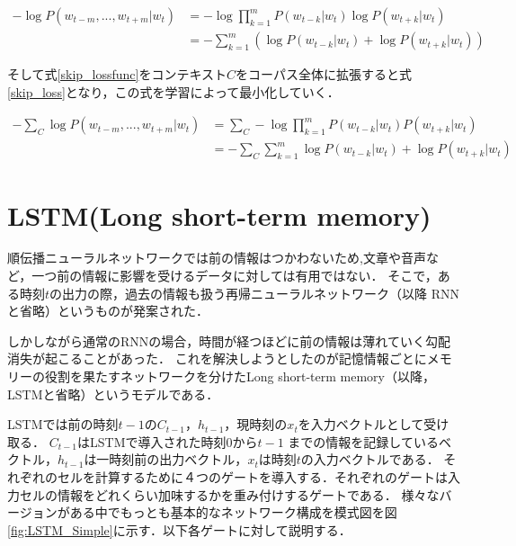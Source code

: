 \documentclass[a4j,11pt,report]{jsbook}
\begin{document}
\begin{equation}
  \label{skip_lossfunc}
  \begin{split}
    -\log P(w_{t-m},...,w_{t+m}|w_{t} ) &= -\log \prod_{k = 1}^m P(w_{t-k}|w_{t}) \log P(w_{t+k}|w_{t})  \\
    &= - \sum_{k = 1}^m  ( \log P(w_{t-k} | w_{t}) + \log P(w_{t+k}|w_{t}) )
  \end{split}
\end{equation}

そして式\ref{skip_lossfunc}をコンテキスト$C$をコーパス全体に拡張すると式\ref{skip_loss}となり，この式を学習によって最小化していく．

\begin{equation}
  \label{skip_loss}
  \begin{split}
    - \sum_{C} \log P(w_{t-m},...,w_{t+m}|w_{t} ) &= \sum_{C} -\log \prod_{k = 1}^m P(w_{t-k}|w_{t}) P(w_{t+k}|w_{t})   \\
    &= - \sum_{C} \sum_{k = 1}^m \log P(w_{t-k} | w_{t}) + \log P(w_{t+k} | w_{t})
  \end{split}
\end{equation}


\chapter{LSTM(Long short-term memory)\label{ch:LSTM}}
順伝播ニューラルネットワークでは前の情報はつかわないため,文章や音声など，一つ前の情報に影響を受けるデータに対しては有用ではない．
そこで，ある時刻$t$の出力の際，過去の情報も扱う再帰ニューラルネットワーク（以降 RNN と省略）というものが発案された．

しかしながら通常のRNNの場合，時間が経つほどに前の情報は薄れていく勾配消失が起こることがあった．
これを解決しようとしたのが記憶情報ごとにメモリーの役割を果たすネットワークを分けたLong short-term memory（以降，LSTMと省略）というモデルである．

LSTMでは前の時刻$t-1$の$C_{t-1}$，$h_{t-1}$，現時刻の$x_{t}$を入力ベクトルとして受け取る．
$C_{t-1}$はLSTMで導入された時刻0から$t-1$ までの情報を記録しているベクトル，$h_{t-1}$は一時刻前の出力ベクトル，$x_{t}$は時刻$t$の入力ベクトルである．
それぞれのセルを計算するために４つのゲートを導入する．それぞれのゲートは入力セルの情報をどれくらい加味するかを重み付けするゲートである．
様々なバージョンがある中でもっとも基本的なネットワーク構成を模式図を図\ref{fig:LSTM_Simple}に示す．以下各ゲートに対して説明する．
\end{document}
